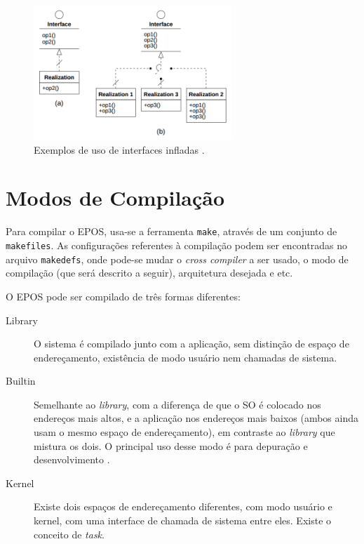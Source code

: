 \begin{figure}[ht!]
	\label{fig:inflated}
    \centering
    \includegraphics[width=7.5cm]{figuras/inflated_interface}
    \caption{Exemplos de uso de interfaces infladas \cite{guto_thesis}.}
\end{figure}




\section{Modos de Compilação}

Para compilar o EPOS, usa-se a ferramenta \verb+make+, através de um conjunto de \verb+makefiles+. As configurações referentes à compilação podem ser encontradas no arquivo \verb+makedefs+, onde pode-se mudar o \emph{cross compiler} a ser usado, o modo de compilação (que será descrito a seguir), arquitetura desejada e etc.


O EPOS pode ser compilado de três formas diferentes:

\begin{description}
\item[Library] O sistema é compilado junto com a aplicação, sem distinção de espaço de endereçamento, existência de modo usuário nem chamadas de sistema.
\item[Builtin] Semelhante ao \emph{library}, com a diferença de que o SO é colocado nos endereços mais altos, e a aplicação nos endereços mais baixos (ambos ainda usam o mesmo espaço de endereçamento), em contraste ao \emph{library} que mistura os dois. O principal uso desse modo é para depuração e desenvolvimento \cite{EPOS}.
\item[Kernel] Existe dois espaços de endereçamento diferentes, com modo usuário e kernel, com uma interface de chamada de sistema entre eles. Existe o conceito de \emph{task}.

\end{description}

